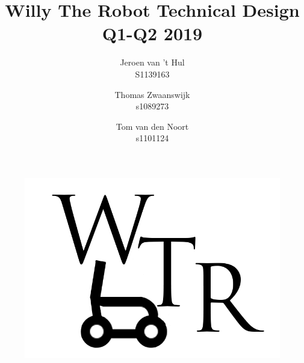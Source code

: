 \documentclass{article} %
\title{\huge Willy The Robot Technical Design Q1-Q2 2019}
\author{Jeroen van 't Hul\\S1139163  \and Thomas Zwaanswijk\\s1089273 \and Tom van den Noort\\s1101124}
\date{\parbox{\linewidth}{\centering
	\today\endgraf\bigskip
	Supervisor \hspace*{3cm} Main Stakeholder \endgraf\medskip
	Mischa Mol \hspace*{3cm} Ilja Clabbers \endgraf\bigskip
	Windesheim Zwolle\endgraf}}
\begin{document}
\maketitle

\begin{figure}[H]
\centering
\includegraphics[width=12 cm]{WTRLogo.png}
\end{figure}
\thispagestyle{empty}
\newpage
\setcounter{page}{1}
\tableofcontents
\newpage







\appendix %

\newpage


\end{document}
